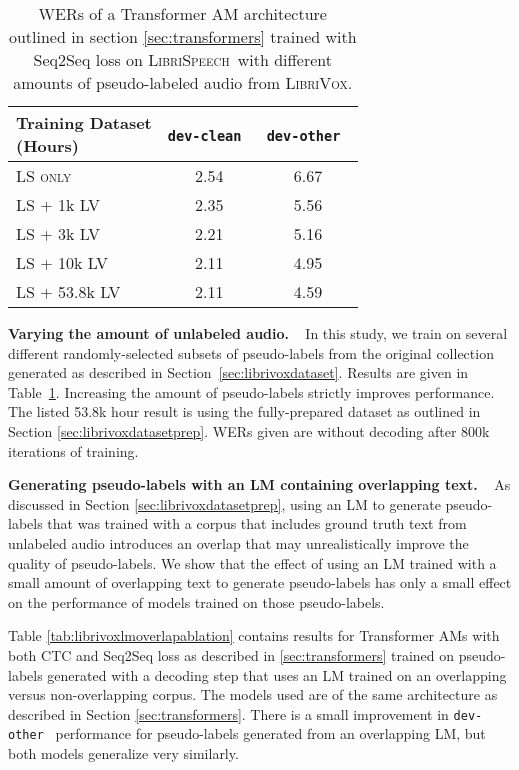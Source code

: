 \documentclass{article}
\def\devclean{\texttt{dev-clean}}
\def\devother{\texttt{dev-other}}
\newcommand{\librivox}{\textsc{LibriVox}}
\newcommand{\librispeech}{\textsc{LibriSpeech}}
\begin{document}
\begin{table}[t]
\caption{WERs of a Transformer AM architecture outlined in section \ref{sec:transformers} trained with Seq2Seq loss on \librispeech~with different amounts of pseudo-labeled audio from \librivox.}
\label{tab:librivoxhoursablation}
\vskip 0.1in
\begin{center}
\begin{small}
\begin{sc}
\begin{tabular}{lcc}
    \toprule
        \shortstack{Training Dataset \\ (Hours)} & \devclean~ & \devother~ \\
    \midrule
    LS \textsc{only} & 2.54 & 6.67 \\
    LS + 1k LV & 2.35 & 5.56 \\
    LS + 3k LV & 2.21 & 5.16 \\
    LS + 10k LV & 2.11 & 4.95 \\
    LS + 53.8k LV & 2.11 & 4.59 \\
    \bottomrule
    \end{tabular}\end{sc}
\end{small}
\end{center}
\vskip -0.1in
\end{table}

\textbf{Varying the amount of unlabeled audio.} ~ In this study, we train on several different randomly-selected subsets of pseudo-labels from the original collection generated as described in Section~\ref{sec:librivoxdataset}. Results are given in Table~\ref{tab:librivoxhoursablation}. Increasing the amount of pseudo-labels strictly improves performance. The listed 53.8k hour result is using the fully-prepared dataset as outlined in Section \ref{sec:librivoxdatasetprep}. WERs given are without decoding after 800k iterations of training.

\textbf{Generating pseudo-labels with an LM containing overlapping text.} ~ As discussed in Section \ref{sec:librivoxdatasetprep}, using an LM to generate pseudo-labels that was trained with a corpus that includes ground truth text from unlabeled audio introduces an overlap that may unrealistically improve the quality of pseudo-labels. We show that the effect of using an LM trained with a small amount of overlapping text to generate pseudo-labels has only a small effect on the performance of models trained on those pseudo-labels.

Table \ref{tab:librivoxlmoverlapablation} contains results for Transformer AMs with both CTC and Seq2Seq loss as described in \ref{sec:transformers} trained on pseudo-labels generated with a decoding step that uses an LM trained on an overlapping versus non-overlapping corpus. The models used are of the same architecture as described in Section \ref{sec:transformers}. There is a small improvement in \devother~ performance for pseudo-labels generated from an overlapping LM, but both models generalize very similarly.
\end{document}
